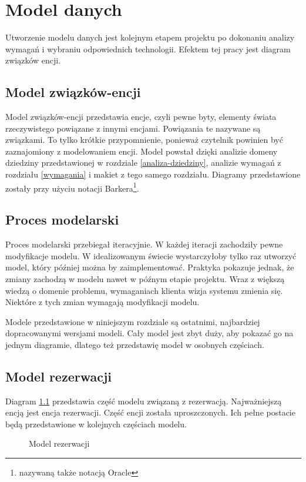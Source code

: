\documentclass[a4paper,onecolumn,oneside,11pt,wide,floatssmall]{mwrep}
\theoremstyle{definition}
\theoremstyle{plain}%
\theoremstyle{remark}
\begin{document}
\chapter{Model danych}
Utworzenie modelu danych jest kolejnym etapem projektu po dokonaniu analizy wymagań i wybraniu odpowiednich technologii. Efektem tej pracy jest diagram związków encji.

\section{Model związków-encji}
Model związków-encji przedstawia encje, czyli pewne byty, elementy świata rzeczywistego powiązane z innymi encjami. Powiązania te nazywane są związkami. To tylko krótkie przypomnienie, ponieważ czytelnik powinien być zaznajomiony z modelowaniem encji. 
Model powstał dzięki analizie domeny dziedziny przedstawionej w rozdziale \ref{analiza-dziedziny}, analizie wymagań z rozdziału \ref{wymagania} i makiet z tego samego rozdziału. Diagramy przedstawione zostały przy użyciu notacji Barkera\footnote{nazywaną także notacją Oracle}.

\section{Proces modelarski}
Proces modelarski przebiegał iteracyjnie. W każdej iteracji zachodziły pewne modyfikacje modelu. W idealizowanym świecie wystarczyłoby tylko raz utworzyć model, który później można by zaimplementować. Praktyka pokazuje jednak, że zmiany zachodzą w modelu nawet w późnym etapie projektu. Wraz z większą wiedzą o domenie problemu, wymaganiach klienta wizja systemu zmienia się. Niektóre z tych zmian wymagają modyfikacji modelu. 

Modele przedstawione w niniejszym rozdziale są ostatnimi, najbardziej dopracowanymi wersjami modeli. Cały model jest zbyt duży, aby pokazać go na jednym diagramie, dlatego też przedstawię model w osobnych częściach.

\section{Model rezerwacji}
Diagram \ref{fig:db-logical-model-reservation} przedstawia część modelu związaną z rezerwacją. Najważniejszą encją jest encja rezerwacji. Część encji została uproszczonych. Ich pełne postacie będą przedstawione w kolejnych częściach modelu.

\begin{figure}[H]
  \begin{center}
  \end{center}
  \caption{Model rezerwacji}
  \label{fig:db-logical-model-reservation}
\end{figure}
\end{document}
